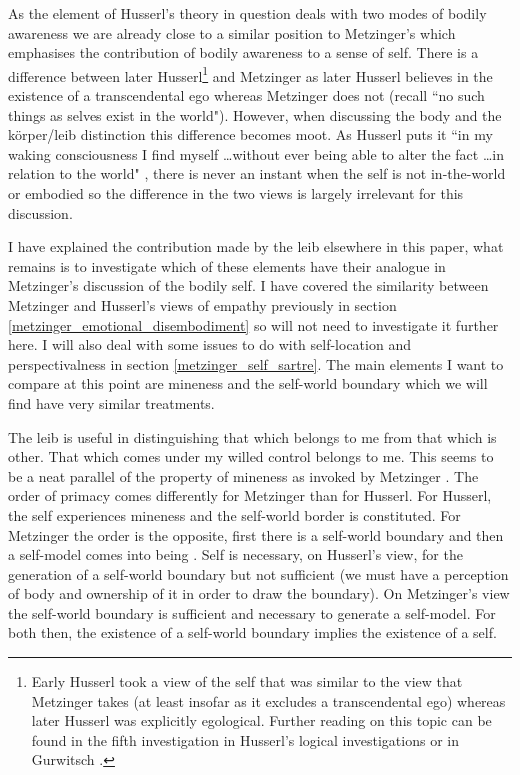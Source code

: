 As the element of Husserl's theory in question deals with two modes of bodily awareness we are already close to a similar position to Metzinger's which emphasises the contribution of bodily awareness to a sense of self. There is a difference between later Husserl\footnote{Early Husserl \cite{husserl2001shorter} took a view of the self that was similar to the view that Metzinger takes (at least insofar as it excludes a transcendental ego) whereas later Husserl was explicitly egological. Further reading on this topic can be found in the fifth investigation in Husserl's logical investigations or in Gurwitsch \cite[pp. 287-300]{gurwitsch1966nonegological}.} and Metzinger as later Husserl believes in the existence of a transcendental ego whereas Metzinger does not (recall ``no such things as selves exist in the world"). However, when discussing the body and the k\"{o}rper/leib distinction this difference becomes moot. As Husserl puts it ``in my waking consciousness I find myself \ldots without ever being able to alter the fact \ldots in relation to the world" \cite[p. 53]{husserl1931}, there is never an instant when the self is not in-the-world or embodied so the difference in the two views is largely irrelevant for this discussion.

I have explained the contribution made by the leib elsewhere in this paper, what remains is to investigate which of these elements have their analogue in Metzinger's discussion of the bodily self. I have covered the similarity between Metzinger and Husserl's views of empathy previously in section \ref{metzinger_emotional_disembodiment} so will not need to investigate it further here. I will also deal with some issues to do with self-location and perspectivalness in section \ref{metzinger_self_sartre}. The main elements I want to compare at this point are mineness and the self-world boundary which we will find have very similar treatments.

The leib is useful in distinguishing that which belongs to me from that which is other. That which comes under my willed control belongs to me. This seems to be a neat parallel of the property of mineness as invoked by Metzinger \cite[p. 302]{metzinger2003}. The order of primacy comes differently for Metzinger than for Husserl. For Husserl, the self experiences mineness and the self-world border is constituted. For Metzinger the order is the opposite, first there is a self-world boundary and then a self-model comes into being \cite[p. 313]{metzinger2003}. Self is necessary, on Husserl's view, for the generation of a self-world boundary but not sufficient (we must have a perception of body and ownership of it in order to draw the boundary). On Metzinger's view the self-world boundary is sufficient and necessary \cite[pp. 307, 313]{metzinger2003} to generate a self-model. For both then, the existence of a self-world boundary implies the existence of a self.

